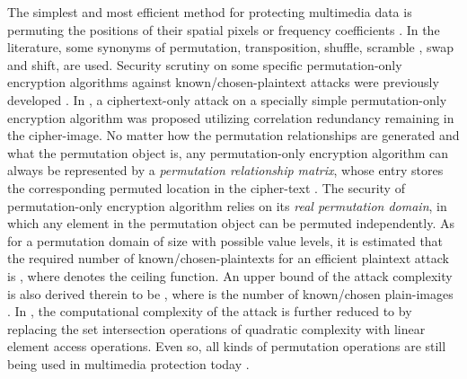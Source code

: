 \documentclass[final,3p,times,twocolumn]{elsarticle}
\begin{document}
The simplest and most efficient method for protecting multimedia data is permuting the positions of their spatial pixels \cite{Matias&Shamir:CurveImageEncryption:Crypto87} or frequency coefficients \cite{Zeng:VideoScrambling:IEEETMM2003}. In the literature, some synonyms of permutation, transposition, shuffle, scramble \cite{Zeng:VideoScrambling:IEEETMM2003}, swap and shift,
are used. Security scrutiny on some specific permutation-only encryption algorithms against known/chosen-plaintext attacks were previously developed \cite{Jan-Tseng:BreakingSCAN:IPL96,Chang-Yu:BreakingSCAN:PRL2002}. In \cite{WHLi:shuffle:ACMM2012}, a ciphertext-only attack on
a specially simple permutation-only encryption algorithm was proposed utilizing correlation redundancy remaining in the cipher-image. No matter how the permutation relationships are generated and what the permutation object is,
any permutation-only encryption algorithm can always be represented by a \textit{permutation relationship matrix}, whose entry
stores the corresponding permuted location in the cipher-text \cite{Li:Permutation:SPIC2008}. The security of permutation-only encryption algorithm
relies on its \textit{real permutation domain}, in which any element in the permutation object can be permuted independently. As for a permutation domain of size  with  possible value levels, it is estimated that the required number of known/chosen-plaintexts for an efficient plaintext attack is , where  denotes the ceiling function. An upper bound of the attack complexity is also derived therein to be
, where  is the number of known/chosen plain-images \cite{Li:Permutation:SPIC2008}. In \cite{Lcq:Optimal:SP11}, the computational complexity of the attack is
further reduced to  by replacing the set intersection operations of quadratic complexity with linear element access operations.
Even so, all kinds of permutation operations are still being used in multimedia protection today \cite{Li:scramble:ITCSVT2008,Sohn:scrambling:TCSVT2011,Zhouyc:perturbation:SP14,SMYU:ARM:IJBC2014}.
\end{document}
